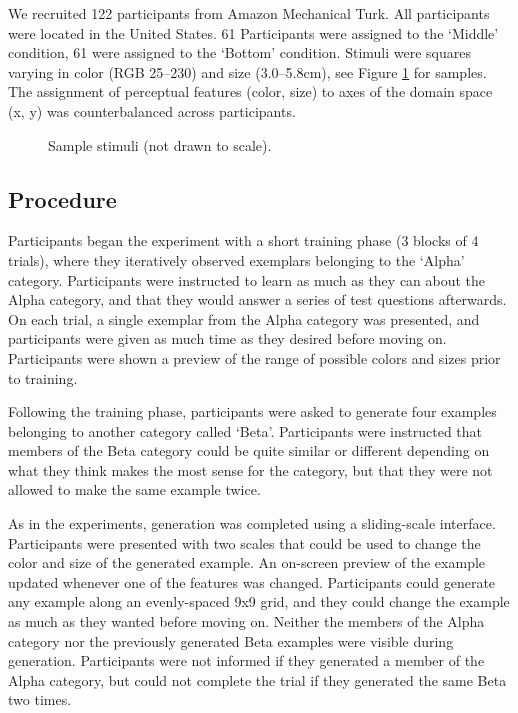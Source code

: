 \documentclass[10pt,letterpaper]{article}
\begin{document}
We recruited 122 participants from Amazon Mechanical Turk. All participants were located in the United States. 61 Participants were assigned to the `Middle' condition, 61 were assigned to the `Bottom' condition. Stimuli were squares varying in color (RGB 25--230) and size (3.0--5.8cm), see Figure \ref{fig:stimuli-samples} for samples. The assignment of perceptual features (color, size) to axes of the domain space (x, y) was counterbalanced across participants.

\begin{figure}
    \begin{center}
    
    \caption{Sample stimuli (not drawn to scale).}
    \label{fig:stimuli-samples}
    \end{center}
\end{figure}

\subsection{Procedure}

Participants began the experiment with a short training phase (3 blocks of 4 trials), where they iteratively observed exemplars belonging to the `Alpha' category. Participants were instructed to learn as much as they can about the Alpha category, and that they would answer a series of test questions afterwards. On each trial, a single exemplar from the Alpha category was presented, and participants were given as much time as they desired before moving on. Participants were shown a preview of the range of possible colors and sizes prior to training.

Following the training phase, participants were asked to generate four examples belonging to another category called `Beta'. Participants were instructed that members of the Beta category could be quite similar or different depending on what they think makes the most sense for the category, but that they were not allowed to make the same example twice. 

As in the \citet{jern2013probabilistic} experiments, generation was completed using a sliding-scale interface. Participants were presented with two scales that could be used to change the color and size of the generated example. An on-screen preview of the example updated whenever one of the features was changed. Participants could generate any example along an evenly-spaced 9x9 grid, and they could change the example as much as they wanted before moving on. Neither the members of the Alpha category nor the previously generated Beta examples were visible during generation. Participants were not informed if they generated a member of the Alpha category, but could not complete the trial if they generated the same Beta two times.
\end{document}
